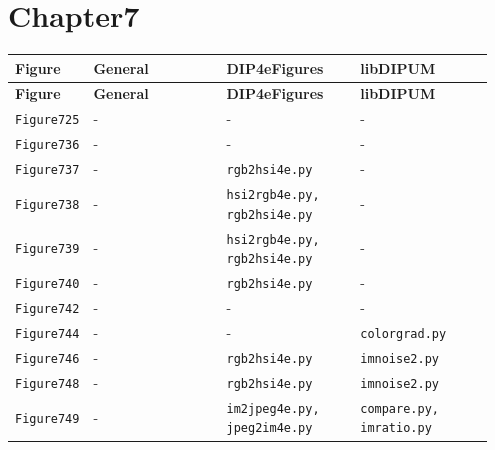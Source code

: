 \documentclass[10pt]{article}
\begin{document}
\section*{Chapter7}
\setlength{\tabcolsep}{4pt}
\begin{longtable}{p{0.11\linewidth} p{0.28\linewidth} p{0.28\linewidth} p{0.28\linewidth}}
\toprule
\textbf{Figure} & \textbf{General} & \textbf{DIP4eFigures} & \textbf{libDIPUM} \\
\midrule
\endfirsthead
\toprule
\textbf{Figure} & \textbf{General} & \textbf{DIP4eFigures} & \textbf{libDIPUM} \\
\midrule
\endhead
\bottomrule
\endfoot
\texttt{Figure725} & - & - & - \\
\texttt{Figure736} & - & - & - \\
\texttt{Figure737} & - & \texttt{rgb2hsi4e.py} & - \\
\texttt{Figure738} & - & \texttt{hsi2rgb4e.py, rgb2hsi4e.py} & - \\
\texttt{Figure739} & - & \texttt{hsi2rgb4e.py, rgb2hsi4e.py} & - \\
\texttt{Figure740} & - & \texttt{rgb2hsi4e.py} & - \\
\texttt{Figure742} & - & - & - \\
\texttt{Figure744} & - & - & \texttt{colorgrad.py} \\
\texttt{Figure746} & - & \texttt{rgb2hsi4e.py} & \texttt{imnoise2.py} \\
\texttt{Figure748} & - & \texttt{rgb2hsi4e.py} & \texttt{imnoise2.py} \\
\texttt{Figure749} & - & \texttt{im2jpeg4e.py, jpeg2im4e.py} & \texttt{compare.py, imratio.py} \\
\end{longtable}
\end{document}
